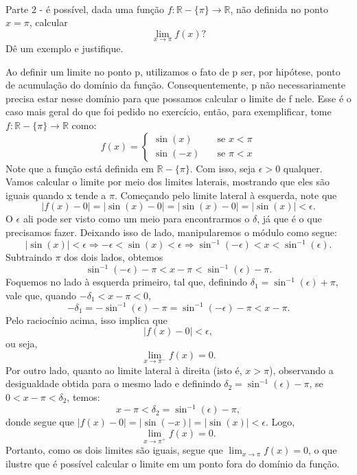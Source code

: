 \documentclass[exercícios_de_cálculo.tex]{subfiles}
\begin{document}
\paragraph{} Parte 2 - é possível, dada uma função $f:\mathbb{R}-\{\pi\}\rightarrow \mathbb{R}$, não definida no ponto $x=\pi$, calcular
$$
	\lim_{x\to\pi}f(x)?
$$
Dê um exemplo e justifique.
\begin{sol*}
	Ao definir um limite no ponto p, utilizamos o fato de p ser, por hipótese, ponto de acumulação do domínio da função. Consequentemente, p n\~ao necessariamente precisa estar nesse dom\'inio para que possamos calcular o limite de f nele. Esse é o caso mais geral do que foi pedido no exerc\'icio, ent\~ao, para exemplificar, tome $f:\mathbb{R}-\{\pi\}\rightarrow\mathbb{R}$ como:
	$$
		f(x) = \left\{\begin{array}{ll}
			\sin(x)  & \quad \text{se } x < \pi \\
			\sin(-x) & \quad \text{se } \pi < x
		\end{array}\right.
	$$
	Note que a função está definida em $\mathbb{R}-\{\pi\}.$ Com isso, seja $\epsilon > 0$ qualquer. Vamos calcular o limite por meio dos limites laterais, mostrando que eles são iguais quando x tende a $\pi$. Começando pelo limite lateral à esquerda, note que
	$$
		|f(x) - 0| = |\sin(x) - 0| = |\sin(x) - 0| = |\sin(x)|< \epsilon.
	$$
	O $\epsilon$ ali pode ser visto como um meio para encontrarmos o $\delta$, já que é o que precisamos fazer. Deixando isso de lado, manipularemos o módulo como segue:
	$$
		|\sin(x)| < \epsilon \Rightarrow -\epsilon < \sin(x) < \epsilon \Rightarrow \sin^{-1}(-\epsilon) < x < \sin^{-1}(\epsilon).
	$$
	Subtraindo $\pi$ dos dois lados, obtemos
	$$
		\sin^{-1}(-\epsilon) - \pi < x - \pi < \sin^{-1}(\epsilon) - \pi.
	$$
	Foquemos no lado à esquerda primeiro, tal que, definindo $\delta_1 = \sin^{-1}(\epsilon) + \pi$, vale que, quando $-\delta_1 < x - \pi < 0$,
	$$
		-\delta_1 = -\sin^{-1}(\epsilon) - \pi = \sin^{-1}(-\epsilon) - \pi < x - \pi.
	$$
	Pelo raciocínio acima, isso implica que
	$$
		|f(x) - 0| < \epsilon,
	$$
	ou seja,
	$$
		\lim_{x\to\pi^{-}}f(x) = 0.
	$$
	Por outro lado, quanto ao limite lateral à direita (isto é, $x > \pi$), observando a desigualdade obtida para o mesmo lado e definindo $\delta_2 = \sin^{-1}(\epsilon) - \pi $, se $0 < x - \pi < \delta_2$, temos:
	$$
		x - \pi < \delta_2 = \sin^{-1}(\epsilon) - \pi,
	$$
	donde segue que $|f(x) - 0| = |\sin(-x)| = |\sin(x)| < \epsilon$. Logo,
	$$
		\lim_{x\to\pi^{+}}f(x) = 0.
	$$
	Portanto, como os dois limites são iguais, segue que $\lim_{x\to\pi} f(x) = 0$, o que ilustre que é possível calcular o limite em um ponto fora do dom\'inio da função.
	\qedsymbol
\end{sol*}
\end{document}
